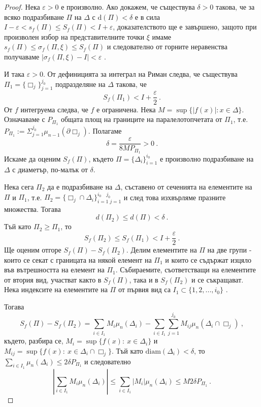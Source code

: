 \documentclass[11pt]{article}
\numberwithin{equation}{section}
\numberwithin{figure}{section}
\numberwithin{table}{section}
\theoremstyle{plain}
\theoremstyle{definition}
\theoremstyle{remark}
\theoremstyle{definition}
\theoremstyle{remark}
\theoremstyle{plain}
\theoremstyle{definition}
\theoremstyle{definition}
\theoremstyle{plain}
\theoremstyle{plain}
\theoremstyle{plain}
\theoremstyle{definition}
\theoremstyle{plain}
\begin{document}
\begin{proof}
Нека $\varepsilon > 0$ е произволно. Ако докажем, че съществува $\delta >0$ такова, че за всяко подразбиване $\Pi$ на $\Delta$ с $\textrm{d}(\Pi)<\delta$ е в сила $I-\varepsilon < s_f(\Pi) \leq S_f(\Pi) < I+\varepsilon$, доказателството ще е завършено, защото при произволен избор на представителните точки $\xi$ имаме
$s_f(\Pi) \leq \sigma_f(\Pi, \xi) \leq S_f(\Pi)$
и следователно от горните неравенства получаваме $|\sigma_f(\Pi, \xi) - I|<\varepsilon$ .

И така $\varepsilon > 0$. От дефиницията за интеграл на Риман следва, че съществува $\Pi_1 = \{\Box_j \}_{j=1}^{j_0}$ подразделяне на $\Delta$ такова, че
$$S_f(\Pi_1) < I+\frac{\varepsilon}{2} \ .$$
От $f$ интегруема следва, че $f$ е  ограничена. Нека $M = \sup\{|f(x)|: x\in\Delta\}$. Означаваме с  $P_{\Pi_1}$  общата площ на границите на паралелотопчетата от $\Pi_1$, т.е. 
$P_{\Pi_1}:= \Sigma_{j=1}^{j_0} \mu_{n-1}\left(\partial \Box_j\right)$. Полагаме $$\delta = \frac{\varepsilon}{8MP_{\Pi_1}}>0 \ .$$  Искаме да оценим $S_f(\Pi)$, където $\Pi =\{\Delta_i \}_{i=1}^{i_0}$ е произволно подразбиване на $\Delta$ с диаметър, по-малък от $\delta$.

Нека сега $\Pi_2$ да е подразбиване на $\Delta$, съставено от сеченията на елементите на $\Pi$ и $\Pi_1$, т.е. $\Pi_2 = \{\Box_j \cap \Delta_i \}_{i=1 \; j=1}^{i_0 \quad j_0}$ и след това изхвърляме празните множества. Тогава $$d(\Pi_2) \leq d(\Pi) < \delta \ .$$ Тъй като $\Pi_2 \ge \Pi_1$, то $$S_f(\Pi_2) \leq S_f(\Pi_1) < I + \frac{\varepsilon}{2} \ .$$  Ще оценим отгоре $S_f(\Pi) - S_f(\Pi_2)$. Делим елементите на $\Pi$ на две групи - които се секат с границата на някой елемент на $\Pi_1$ и които се съдържат изцяло във вътрешността на елемент на $\Pi_1$. Събираемите, съответстващи на елементите от втория вид, участват както в $S_f(\Pi)$, така и в $S_f(\Pi_2)$ и се съкращават. Нека индексите на елементите на $\Pi$ от първия вид са $I_1 \subset \{1, 2, ..., i_0 \}$ .

Тогава
\begin{dmath*}
S_f(\Pi) - S_f(\Pi_2) = \sum_{i\in I_1} M_i \mu_n (\Delta_i) - \sum_{i\in I_1} \sum_{j=1}^{j_0} M_{ij} \mu_n (\Delta_i\cap \Box_j) \ ,
\end{dmath*}
където, разбира се, $M_i=\sup\{ f(x): \ x\in \Delta_i\}$ и $M_{ij}=\sup\{ f(x): \ x\in \Delta_i\cap \Box_j\}$. Тъй като 
$\textrm{diam}(\Delta_i)<\delta$, то $\sum_{i\in I_1} \mu_n (\Delta_i) \leq 2 \delta P_{\Pi_1}$ и следователно $$\left|\sum_{i\in I_1} M_i \mu_n (\Delta_i)\right|\leq \sum_{i\in I_1} \left| M_i\right| \mu_n (\Delta_i) \le M 2 \delta P_{\Pi_1} \ .$$


\end{proof}
\end{document}
